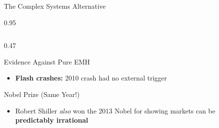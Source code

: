 \documentclass[9pt, aspectratio=169, t]{beamer}
\begin{document}
\begin{frame}{The Complex Systems Alternative}
\begin{cminipage}{0.95\textwidth}
{\begin{columns}[T]
\begin{column}{0.47\textwidth}
\begin{exampleblock}{Evidence Against Pure EMH}
\begin{itemize}
                    \item \textbf{Flash crashes:} 2010 crash had no external trigger
                \end{itemize}
            \end{exampleblock}
            \vspace{-1mm}
            \begin{block}{Nobel Prize (Same Year!)}
                \begin{itemize}\setlength{\itemsep}{0pt}
                    \item Robert Shiller \textit{also} won the 2013 Nobel for showing markets can be \textbf{predictably irrational}
                \end{itemize}
            \end{block}
        \end{column}
    \end{columns}
    }
    \end{cminipage}
\end{frame}
\end{document}
